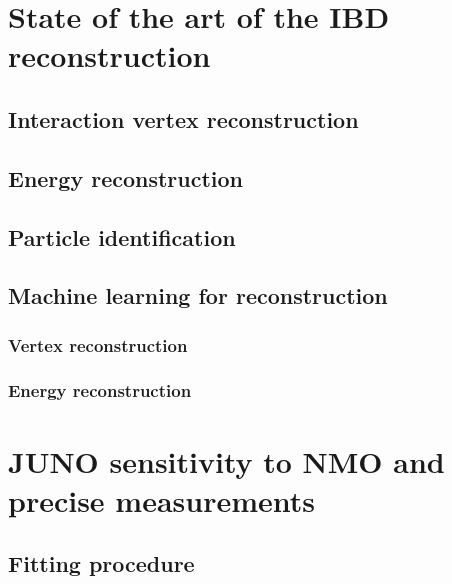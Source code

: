 \section{State of the art of the IBD reconstruction}

\subsection{Interaction vertex reconstruction}

\subsection{Energy reconstruction}

\subsection{Particle identification}

\subsection{Machine learning for reconstruction}

\subsubsection{Vertex reconstruction}

\subsubsection{Energy reconstruction}

\section{JUNO sensitivity to NMO and precise measurements}

\subsection{Fitting procedure}
\label{sec:Fit}
